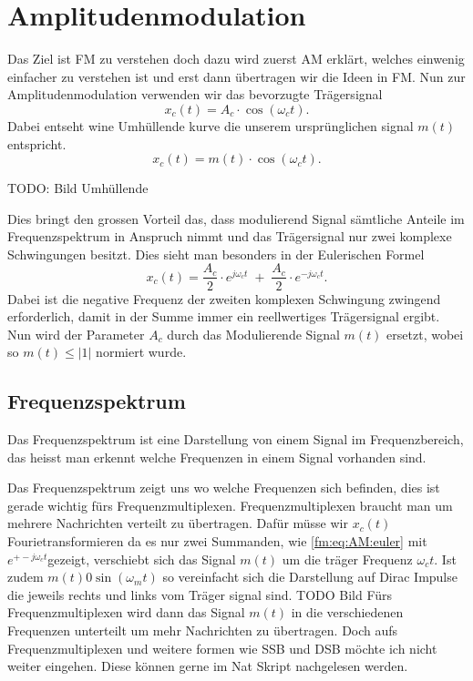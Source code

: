 %
%
%
\section{Amplitudenmodulation\label{fm:section:teil0}}

Das Ziel ist FM zu verstehen doch dazu wird zuerst AM erklärt, welches einwenig einfacher zu verstehen ist und erst dann übertragen wir die Ideen in FM.
Nun zur Amplitudenmodulation verwenden wir das bevorzugte Trägersignal
\[
    x_c(t) = A_c \cdot \cos(\omega_ct).
\]
Dabei entseht wine Umhüllende kurve die unserem ursprünglichen signal \(m(t)\) entspricht.
\[
    x_c(t) = m(t) \cdot \cos(\omega_ct).
\]

TODO: Bild Umhüllende


Dies bringt den grossen Vorteil das, dass modulierend Signal sämtliche Anteile im Frequenzspektrum in Anspruch nimmt 
und das Trägersignal nur zwei komplexe Schwingungen besitzt. 
Dies sieht man besonders in der Eulerischen Formel
\[
    x_c(t) = \frac{A_c}{2} \cdot e^{j\omega_ct}\;+\;\frac{A_c}{2} \cdot e^{-j\omega_ct}.
    \label{fm:eq:AM:euler}
\]
Dabei ist die negative Frequenz der zweiten komplexen Schwingung zwingend erforderlich, damit in der Summe immer ein reellwertiges Trägersignal ergibt.
Nun wird der Parameter \(A_c\) durch das  Modulierende Signal \(m(t)\) ersetzt, wobei so \(m(t) \leqslant |1|\) normiert wurde.

\subsection{Frequenzspektrum}
Das Frequenzspektrum ist eine Darstellung von einem Signal im Frequenzbereich, das heisst man erkennt welche Frequenzen in einem Signal vorhanden sind.

Das Frequenzspektrum zeigt uns wo welche Frequenzen sich befinden, dies ist gerade wichtig fürs Frequenzmultiplexen.
Frequenzmultiplexen braucht man um mehrere Nachrichten verteilt zu übertragen.
Dafür müsse wir \(x_c(t)\) Fourietransformieren da es nur zwei Summanden, wie \eqref{fm:eq:AM:euler} mit \(e^{+-j\omega_ct}\)gezeigt, verschiebt sich das Signal \(m(t)\) um die träger Frequenz \(\omega_ct\).
Ist zudem \(m(t) 0 \sin(\omega_m t)\) so vereinfacht sich die Darstellung auf Dirac Impulse die jeweils rechts und links vom Träger signal sind.
TODO Bild 
Fürs Frequenzmultiplexen wird dann das Signal \(m(t)\) in die verschiedenen Frequenzen unterteilt um mehr Nachrichten zu übertragen.
Doch aufs Frequenzmultiplexen und weitere formen wie SSB und DSB möchte ich nicht weiter eingehen.
Diese können gerne im Nat Skript nachgelesen werden.


